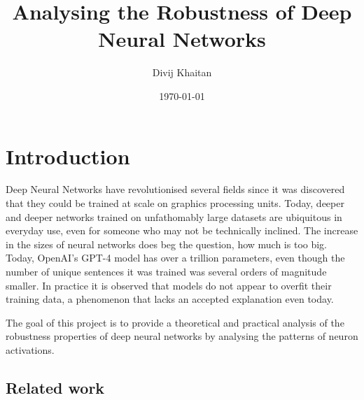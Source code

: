 \documentclass{article}
\title{Analysing the Robustness of Deep Neural Networks}
\author{Divij Khaitan}
\date{\today}
\begin{document}
    \maketitle

    \section{Introduction}
        Deep Neural Networks have revolutionised several fields since it was discovered that they could be trained at scale on graphics processing units. Today, deeper and deeper networks trained on unfathomably large datasets are ubiquitous in everyday use, even for someone who may not be technically inclined. The increase in the sizes of neural networks does beg the question, how much is too big. Today, OpenAI's GPT-4 model has over a trillion parameters, even though the number of unique sentences it was trained was several orders of magnitude smaller. In practice it is observed that models do not appear to overfit their training data, a phenomenon that lacks an accepted explanation even today.
        
        The goal of this project is to provide a theoretical and practical analysis of the robustness properties of deep neural networks by analysing the patterns of neuron activations. 
        \subsection{Related work}
            
\end{document}
